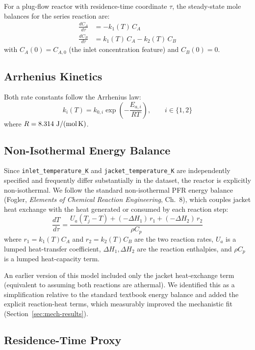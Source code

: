 \documentclass[11pt,a4paper]{article}
\begin{document}
For a plug-flow reactor with residence-time coordinate $\tau$, the steady-state mole balances for
the series reaction are:
\begin{align}
  \frac{dC_A}{d\tau} &= -k_1(T)\, C_A \\
  \frac{dC_B}{d\tau} &= k_1(T)\, C_A - k_2(T)\, C_B
\end{align}
with $C_A(0) = C_{A,0}$ (the inlet concentration feature) and $C_B(0) = 0$.

\subsection{Arrhenius Kinetics}

Both rate constants follow the Arrhenius law:
\begin{equation}
  k_i(T) = k_{0,i} \exp\!\left(-\frac{E_{a,i}}{RT}\right), \qquad i \in \{1, 2\}
\end{equation}
where $R = 8.314\ \text{J/(mol\,K)}$.

\subsection{Non-Isothermal Energy Balance}

Since \texttt{inlet\_temperature\_K} and \texttt{jacket\_temperature\_K} are independently
specified and frequently differ substantially in the dataset, the reactor is explicitly
non-isothermal. We follow the standard non-isothermal PFR energy balance
(Fogler, \emph{Elements of Chemical Reaction Engineering}, Ch.~8), which couples jacket heat
exchange with the heat generated or consumed by each reaction step:
\begin{equation}
  \frac{dT}{d\tau} = \frac{U_a (T_j - T) + (-\Delta H_1)\, r_1 + (-\Delta H_2)\, r_2}{\rho C_p}
\end{equation}
where $r_1 = k_1(T) C_A$ and $r_2 = k_2(T) C_B$ are the two reaction rates, $U_a$ is a lumped
heat-transfer coefficient, $\Delta H_1, \Delta H_2$ are the reaction enthalpies, and $\rho C_p$
is a lumped heat-capacity term.

An earlier version of this model included only the jacket heat-exchange term (equivalent to
assuming both reactions are athermal). We identified this as a simplification relative to the
standard textbook energy balance and added the explicit reaction-heat terms, which measurably
improved the mechanistic fit (Section~\ref{sec:mech-results}).

\subsection{Residence-Time Proxy}
\end{document}
